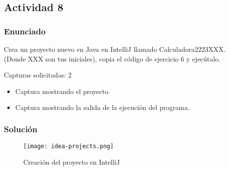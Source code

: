 \subsection{Actividad 8}
\subsubsection{Enunciado}
Crea un proyecto nuevo en Java en IntelliJ llamado Calculadora2223XXX. (Donde XXX son tus iniciales), copia el código de ejercicio 6 y ejecútalo.

Capturas solicitadas: 2
\begin{itemize}
    \item Captura mostrando el proyecto.
    \item Captura mostrando la salida de la ejecución del programa.
\end{itemize}

\subsubsection{Solución}

\begin{figure}[ht]
    \centering
    \texttt{[image: idea-projects.png]}
    \caption{Creación del proyecto en IntelliJ}
\end{figure}


\newpage



